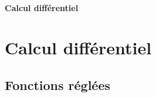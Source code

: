 \ifsolo
    ~

    \vspace{1cm}

    \begin{center}
        \textbf{\LARGE Calcul différentiel} \\[1em]
    \end{center}
    \tableofcontents
\else
    \chapter{Calcul différentiel}

    \minitoc
\fi
\thispagestyle{empty}

\section{Fonctions réglées}
